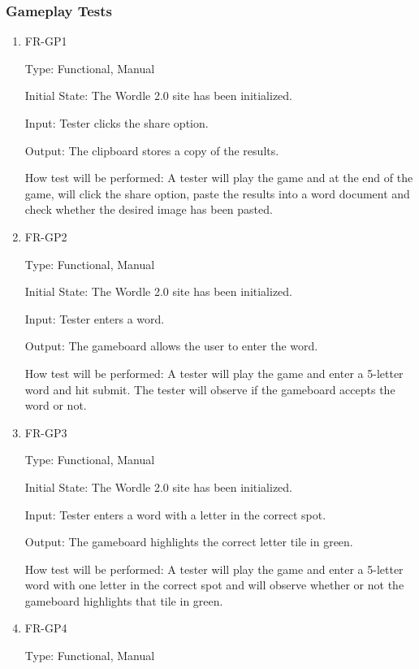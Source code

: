 \documentclass[12pt, titlepage]{article}
\begin{document}
\subsubsection{Gameplay Tests}
\begin{enumerate}
\item{FR-GP1\\}

Type: Functional, Manual

Initial State: The Wordle 2.0 site has been initialized.

Input: Tester clicks the share option.

Output: The clipboard stores a copy of the results.

How test will be performed: A tester will play the game and at the end of the 
game, will click the share option, paste the results into a word document and 
check whether the desired image has been pasted.

\item{FR-GP2\\}

Type: Functional, Manual

Initial State: The Wordle 2.0 site has been initialized.

Input: Tester enters a word.

Output: The gameboard allows the user to enter the word.

How test will be performed: A tester will play the game and enter a 5-letter 
word and hit submit. The tester will observe if the gameboard accepts the word 
or not.

\item{FR-GP3\\}

Type: Functional, Manual

Initial State: The Wordle 2.0 site has been initialized.

Input: Tester enters a word with a letter in the correct spot.

Output: The gameboard highlights the correct letter tile in green.

How test will be performed: A tester will play the game and enter a 5-letter 
word with one letter in the correct spot and will observe whether or not the 
gameboard 
highlights that tile in green.

\item{FR-GP4\\}

Type: Functional, Manual


\end{enumerate}
\end{document}
